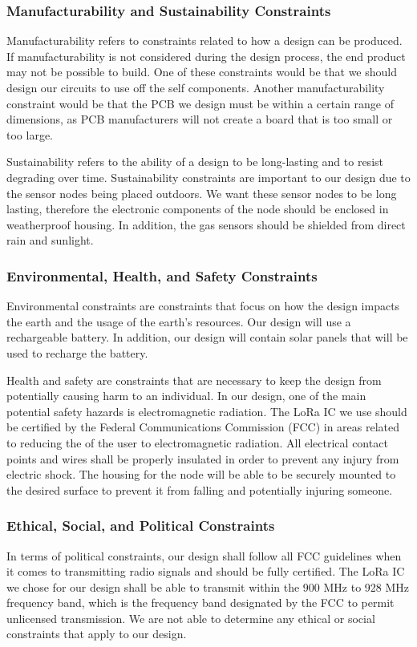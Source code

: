 \subsubsection{Manufacturability and Sustainability Constraints}
Manufacturability refers to constraints related to how a design can be produced. If manufacturability is not considered during the design process, the end product may not be possible to build. One of these constraints would be that we should design our circuits to use off the self components. Another manufacturability constraint would be that the PCB we design must be within a certain range of dimensions, as PCB manufacturers will not create a board that is too small or too large.

Sustainability refers to the ability of a design to be long-lasting and to resist degrading over time. Sustainability constraints are important to our design due to the sensor nodes being placed outdoors. We want these sensor nodes to be long lasting, therefore the electronic components of the node should be enclosed in weatherproof housing. In addition, the gas sensors should be shielded from direct rain and sunlight.

\subsubsection{Environmental, Health, and Safety Constraints}
Environmental constraints are constraints that focus on how the design impacts the earth and the usage of the earth's resources. Our design will use a rechargeable battery. In addition, our design will contain solar panels that will be used to recharge the battery.

Health and safety are constraints that are necessary to keep the design from potentially causing harm to an individual. In our design, one of the main potential safety hazards is electromagnetic radiation. The LoRa IC we use should be certified by the Federal Communications Commission (FCC) in areas related to reducing the of the user to electromagnetic radiation. All electrical contact points and wires shall be properly insulated in order to prevent any injury from electric shock. The housing for the node will be able to be securely mounted to the desired surface to prevent it from falling and potentially injuring someone.

\subsubsection{Ethical, Social, and Political Constraints}
In terms of political constraints, our design shall follow all FCC guidelines when it comes to transmitting radio signals and should be fully certified. The LoRa IC we chose for our design shall be able to transmit within the 900 MHz to 928 MHz frequency band, which is the frequency band designated by the FCC to permit unlicensed transmission. We are not able to determine any ethical or social constraints that apply to our design.